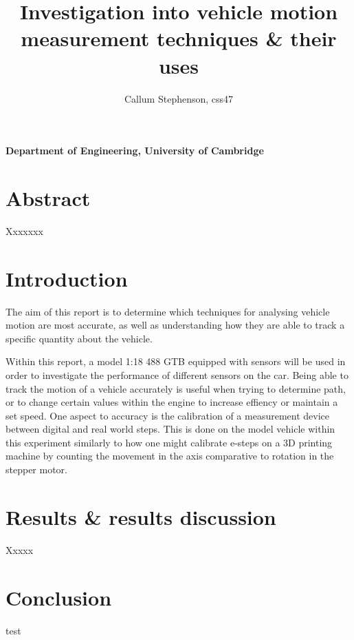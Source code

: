 \documentclass[a4,12pt]{article}
\title{\textbf{Investigation into vehicle motion measurement techniques \& their uses}}
\author{Callum Stephenson, css47}
\date{}
\begin{document}
    \begin{titlepage}
        \maketitle
        \thispagestyle{empty}
        \vspace{13cm}
        \textbf{Department of Engineering, University of Cambridge}
    \end{titlepage}
    \tableofcontents
    \newpage
    \section{Abstract}
    Xxxxxxx
    \section{Introduction}
    The aim of this report is to determine which techniques for analysing vehicle motion are most accurate, as well as 
    understanding how they are able to track a specific quantity about the vehicle. 
    
    Within this report, a model 1:18 488 GTB equipped with sensors will be used in order to investigate the performance of
    different sensors on the car. Being able to track the motion of a vehicle accurately is useful when trying to determine path,
    or to change certain values within the engine to increase effiency or maintain a set speed. One aspect to accuracy is the calibration of
    a measurement device between digital and real world steps. This is done on the model vehicle within this experiment similarly to
    how one might calibrate e-steps on a 3D printing machine by counting the movement in the axis comparative to rotation in the stepper motor.

    \section{Results \& results discussion}
    Xxxxx
    \section{Conclusion}
    test
    \begin{thebibliography}{99}
        
    \end{thebibliography}
\end{document}

